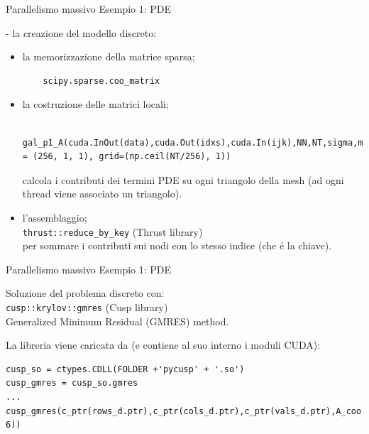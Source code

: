 \documentclass{beamer}
\begin{document}
\begin{frame}[fragile]{Parallelismo massivo}
Esempio 1: PDE

- la creazione del modello discreto:
\begin{itemize}
\item la memorizzazione della matrice sparsa;
	\begin{lstlisting}
	scipy.sparse.coo_matrix
	\end{lstlisting}
\item la costruzione delle matrici locali;
	\begin{lstlisting}
	gal_p1_A(cuda.InOut(data),cuda.Out(idxs),cuda.In(ijk),NN,NT,sigma,mu,cuda.In(b),tDt,NN,NT,block = (256, 1, 1), grid=(np.ceil(NT/256), 1))
	\end{lstlisting}
	calcola i contributi dei termini PDE su ogni triangolo della mesh (ad ogni thread viene associato un triangolo).
\item l'assemblaggio;\\
	\begingroup
		\color{blue!40!black}
		\fontsize{9pt}{9pt}
		\verb#thrust::reduce_by_key#
	\endgroup
	\hspace{.1cm}(Thrust library)\\
	per sommare i contributi sui nodi con lo stesso indice (che \'e la chiave).
\end{itemize}


\end{frame}


\begin{frame}[fragile]{Parallelismo massivo}
Esempio 1: PDE

Soluzione del problema discreto con:\\
\begingroup
	\color{blue!40!black}
	\fontsize{9pt}{9pt}
	\verb#cusp::krylov::gmres#
\endgroup
\hspace{.1cm}(Cusp library)\\
Generalized Minimum Residual (GMRES) method.

La libreria viene caricata da \verb@ctypes@ (e contiene al suo interno i moduli CUDA):
\begin{lstlisting}
cusp_so = ctypes.CDLL(FOLDER +'pycusp' + '.so')
cusp_gmres = cusp_so.gmres
...
cusp_gmres(c_ptr(rows_d.ptr),c_ptr(cols_d.ptr),c_ptr(vals_d.ptr),A_coo.shape[0],A_coo.shape[1],A_coo.nnz,c_ptr(b_d.ptr),c_ptr(x_d.ptr),500,ctypes.c_float(1e-6))
\end{lstlisting}

\end{frame}
\end{document}
